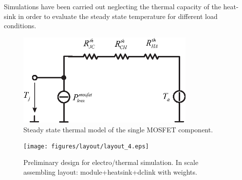 \documentclass[11pt,a4paper,oneside]{book}
\numberwithin{equation}{section}
\theoremstyle{it}
\theoremstyle{definition}
\begin{document}
Simulations have been carried out neglecting the thermal capacity of the heat-sink in order to evaluate the steady state temperature for different load conditions.
 \begin{figure}[H]
 	\centering
 	\includegraphics[width = 250pt, angle = 0, 
 	keepaspectratio]{figures/thermal_model/thermal_model_fig_1.eps}
 	\captionsetup{width=0.5\textwidth, font=small}	
 	\caption{Steady state thermal model of the single MOSFET component.}
 	\label{}
 \end{figure}

\begin{figure}[H]
	\centering
	\texttt{[image: figures/layout/layout\_4.eps]}
	\captionsetup{width=0.5\textwidth, font=small}	
	\caption{Preliminary design for electro/thermal simulation. In scale assembling layout: module+heatsink+dclink with weights.}
	\label{}
\end{figure}
\end{document}
